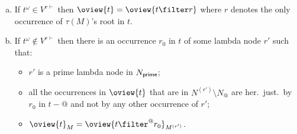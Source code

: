 \begin{proposition}
\begin{itemize}
\begin{enumerate}[a.]
            \item If $t^\omega \in V^{r\vdash}$ then $\oview{t} = \oview{t\filter r}$
            where $r$ denotes the only occurrence of $\tau(M)$'s root in $t$.

            \item If $t^\omega \not\in V^{r\vdash}$ then there is an occurrence $r_0$ in $t$ of some lambda node $r'$ such that:
                \begin{itemize}
                \item $r'$ is a prime lambda node in $N_{\sf prime}$;
                \item all the occurrences in $\oview{t}$ that are in $N^{(r')}\setminus N_@$ are her.\ just.\ by $r_0$ in $t-@$
                and not by any other occurrence of $r'$;
                \item  $\oview{t}_M  = \oview{t\filter^{@} r_0}_{M^{(r')}}$.
                \end{itemize}
            \end{enumerate}

    \end{itemize}
\end{proposition}


